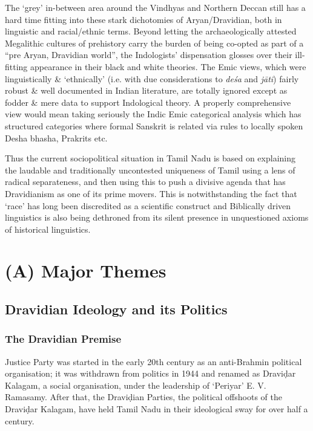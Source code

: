 The ‘grey’ in-between area around the Vindhyas and Northern Deccan still has a hard time fitting into these stark dichotomies of Aryan/Dravidian, both in linguistic and racial/ethnic terms. Beyond letting the archaeologically attested Megalithic cultures of prehistory carry the burden of being co-opted as part of a “pre Aryan, Dravidian world”, the Indologists’ dispensation glosses over their ill-fitting appearance in their black and white theories. The Emic views, which were linguistically \& ‘ethnically’ (i.e. with due considerations to \textit{deśa} and \textit{jāti}) fairly robust \& well documented in Indian literature, are totally ignored except as fodder \& mere data to support Indological theory. A properly comprehensive view would mean taking seriously the Indic Emic categorical analysis which has structured categories where formal Sanskrit is related via rules to locally spoken Desha bhasha, Prakrits etc.

Thus the current sociopolitical situation in Tamil Nadu is based on explaining the laudable and traditionally uncontested uniqueness of Tamil using a lens of radical separateness, and then using this to push a divisive agenda that has Dravidianism as one of its prime movers. This is notwithstanding the fact that ‘race’ has long been discredited as a scientific construct and Biblically driven linguistics is also being dethroned from its silent presence in unquestioned axioms of historical linguistics.


\section*{(A) Major Themes}

\subsection*{Dravidian Ideology and its Politics}

\subsubsection{The Dravidian Premise}

Justice Party was started in the early 20th century as an anti-Brahmin political organisation; it was withdrawn from politics in 1944 and renamed as Draviḍar Kalagam, a social organisation, under the leadership of ‘Periyar’ E. V. Ramasamy. After that, the Draviḍian Parties, the political offshoots of the Draviḍar Kalagam, have held Tamil Nadu in their ideological sway for over half a century.

